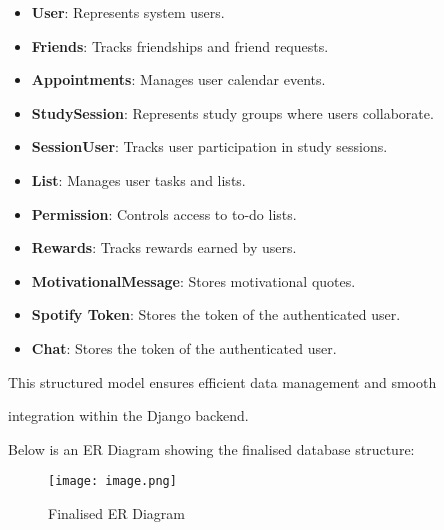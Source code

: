 \documentclass[a4paper,12pt]{article}
\begin{document}
\begin{itemize}

    \item \textbf{User}: Represents system users.

    \item \textbf{Friends}: Tracks friendships and friend requests.

    \item \textbf{Appointments}: Manages user calendar events.

    \item \textbf{StudySession}: Represents study groups where users collaborate.

    \item \textbf{SessionUser}: Tracks user participation in study sessions.

    \item \textbf{List}: Manages user tasks and lists.

    \item \textbf{Permission}: Controls access to to-do lists.

    \item \textbf{Rewards}: Tracks rewards earned by users.

    \item \textbf{MotivationalMessage}: Stores motivational quotes.

    \item \textbf{Spotify Token}: Stores the token of the authenticated user.

    \item \textbf{Chat}: Stores the token of the authenticated user.

\end{itemize}



\noindent This structured model ensures efficient data management and smooth

integration within the Django backend.



Below is an ER Diagram showing the finalised database structure:

\begin{figure}[H]

    \centering

    \texttt{[image: image.png]}

    \caption{Finalised ER Diagram}

    \label{fig:er-diagram}

\end{figure}
\end{document}
